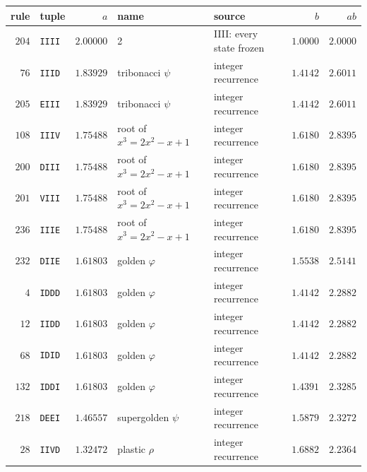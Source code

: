 \begin{tabular}{rlrllrr}
\hline
rule & tuple & $a$ & name & source & $b$ & $ab$ \\
\hline
$204$ & \texttt{IIII} & $2.00000$ & 2 & IIII: every state frozen & $1.0000$ & $2.0000$ \\
$76$ & \texttt{IIID} & $1.83929$ & tribonacci $\psi$ & integer recurrence & $1.4142$ & $2.6011$ \\
$205$ & \texttt{EIII} & $1.83929$ & tribonacci $\psi$ & integer recurrence & $1.4142$ & $2.6011$ \\
$108$ & \texttt{IIIV} & $1.75488$ & root of $x^3=2x^2-x+1$ & integer recurrence & $1.6180$ & $2.8395$ \\
$200$ & \texttt{DIII} & $1.75488$ & root of $x^3=2x^2-x+1$ & integer recurrence & $1.6180$ & $2.8395$ \\
$201$ & \texttt{VIII} & $1.75488$ & root of $x^3=2x^2-x+1$ & integer recurrence & $1.6180$ & $2.8395$ \\
$236$ & \texttt{IIIE} & $1.75488$ & root of $x^3=2x^2-x+1$ & integer recurrence & $1.6180$ & $2.8395$ \\
$232$ & \texttt{DIIE} & $1.61803$ & golden $\varphi$ & integer recurrence & $1.5538$ & $2.5141$ \\
$4$ & \texttt{IDDD} & $1.61803$ & golden $\varphi$ & integer recurrence & $1.4142$ & $2.2882$ \\
$12$ & \texttt{IIDD} & $1.61803$ & golden $\varphi$ & integer recurrence & $1.4142$ & $2.2882$ \\
$68$ & \texttt{IDID} & $1.61803$ & golden $\varphi$ & integer recurrence & $1.4142$ & $2.2882$ \\
$132$ & \texttt{IDDI} & $1.61803$ & golden $\varphi$ & integer recurrence & $1.4391$ & $2.3285$ \\
$218$ & \texttt{DEEI} & $1.46557$ & supergolden $\psi$ & integer recurrence & $1.5879$ & $2.3272$ \\
$28$ & \texttt{IIVD} & $1.32472$ & plastic $\rho$ & integer recurrence & $1.6882$ & $2.2364$ \\
\hline
\end{tabular}

